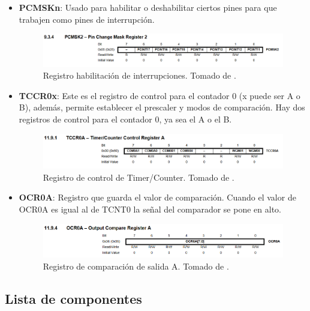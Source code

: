 \begin{itemize}
    \item \textbf{PCMSKn}: Usado para habilitar o deshabilitar ciertos pines para que trabajen como pines de interrupción.
    \begin{figure}[H]
        \centering
        \includegraphics[width=.9\linewidth]{Imagenes/PCMSK.png}
        \caption{Registro habilitación de interrupciones. Tomado de \cite{web}.}
        \label{fig7}
    \end{figure}

    \item \textbf{TCCR0x}: Este es el registro de control para el contador 0 (x puede ser A o B), además, permite establecer el prescaler y modos de comparación. Hay dos registros de control para el contador 0, ya sea el A o el B.
    \begin{figure}[H]
        \centering
        \includegraphics[width=.9\linewidth]{Imagenes/TCCR0A.png}
        \caption{Registro de control de Timer/Counter. Tomado de \cite{web}.}
        \label{fig8}
    \end{figure}

    \item \textbf{OCR0A}: Registro que guarda el valor de comparación. Cuando el valor de OCR0A es igual al de TCNT0 la señal del comparador se pone en alto.
    \begin{figure}[H]
        \centering
        \includegraphics[width=.9\linewidth]{Imagenes/OCR0A.png}
        \caption{Registro de comparación de salida A. Tomado de \cite{web}.}
        \label{fig9}
    \end{figure}
    
\end{itemize}

\subsection*{Lista de componentes}

